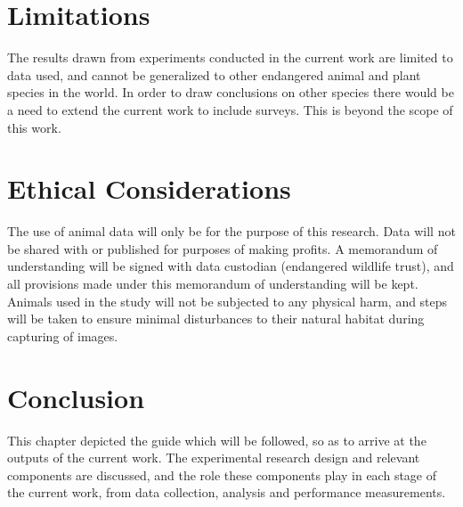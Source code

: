 \section{Limitations}
The results drawn from experiments conducted in the current work are limited to data used, and cannot be generalized to other endangered animal and plant species in the world. In order to draw conclusions on other species there would be a need to extend the current work to include surveys. This is beyond the scope of this work.   

\section{Ethical Considerations}
The use of animal data will only be for the purpose of this research. Data will not be shared with or published for purposes of making profits. A memorandum of understanding will be signed with data custodian (endangered wildlife trust), and all provisions made under this memorandum of understanding will be kept. Animals used in the study will not be subjected to any physical harm, and steps will be taken to ensure minimal disturbances to their natural habitat during capturing of images. 

\section{Conclusion}
This chapter depicted the guide which will be followed, so as to arrive at the outputs of the current work. The experimental research design and relevant components are discussed, and the role these components play in each stage of the current work, from data collection, analysis and performance measurements. 
